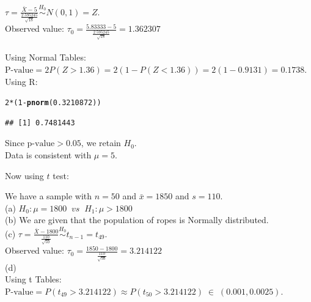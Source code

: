 \documentclass[bigtut]{tutorial}\usepackage[]{graphicx}\usepackage[]{color}
\makeatletter
\newcommand{\hlnum}[1]{\textcolor[rgb]{0.686,0.059,0.569}{#1}}%
\newcommand{\hlopt}[1]{\textcolor[rgb]{0,0,0}{#1}}%
\newcommand{\hlstd}[1]{\textcolor[rgb]{0.345,0.345,0.345}{#1}}%
\newcommand{\hlkwd}[1]{\textcolor[rgb]{0.737,0.353,0.396}{\textbf{#1}}}%
\newenvironment{kframe}{%
 \def\at@end@of@kframe{}%
 \ifinner\ifhmode%
  \def\at@end@of@kframe{\end{minipage}}%
  \begin{minipage}{\columnwidth}%
 \fi\fi%
 \def\FrameCommand##1{\hskip\@totalleftmargin \hskip-\fboxsep
 \colorbox{shadecolor}{##1}\hskip-\fboxsep
     \hskip-\linewidth \hskip-\@totalleftmargin \hskip\columnwidth}%
 \MakeFramed {\advance\hsize-\width
   \@totalleftmargin\z@ \linewidth\hsize
   \@setminipage}}%
 {\par\unskip\endMakeFramed%
 \at@end@of@kframe}
\newenvironment{knitrout}{}{} %
\makeatother
\begin{document}
\begin{tutorial}
\begin{questions}
\begin{solution}
$\tau = \frac{ \bar{X} - 5}{\frac{2.595245}{\sqrt{18}}} \overset{H_0}{\sim} N(0,1) = Z$. \\
Observed value: $\tau_{0} = \frac{5.83333-5}{\frac{2.595245}{\sqrt{18}}} = 1.362307$ \\

 \\

Using Normal Tables: \\
$\text{P-value} = 2 P( Z > 1.36) = 2(1-P(Z < 1.36)) = 2(1-0.9131)  = 0.1738$. \\

Using R:
\begin{knitrout}
\color{fgcolor}\begin{kframe}
\begin{alltt}
\hlnum{2}\hlopt{*}\hlstd{(}\hlnum{1}\hlopt{-}\hlkwd{pnorm}\hlstd{(}\hlnum{0.3210872}\hlstd{))}
\end{alltt}
\begin{verbatim}
## [1] 0.7481443
\end{verbatim}
\end{kframe}
\end{knitrout}

\vspace{.5cm}
Since $\text{p-value} > 0.05$, we retain $H_{0}$. \\
Data is consistent with $\mu = 5$.

\vspace{1cm}
Now using $t$ test:

We have a sample with $n=50$ and $\bar{x}=1850$ and $s=110$. \\

(a)
$H_0: \mu=1800  \;\; vs \;\; H_1: \mu>1800$ \\

(b)
We are given that the population of ropes is Normally distributed. \\

(c)
$\tau = \frac{ \bar{X} - 1800}{\frac{110}{\sqrt{50}} } \overset{H_0}{\sim}  t_{n-1} = t_{49}$. \\
Observed value: $\tau_{0} = \frac{1850-1800}{\frac{110}{\sqrt{50}} } = 3.214122 $ \\

(d)
 \\

Using t Tables: \\
$\text{P-value} = P( t_{49} > 3.214122 ) \approx  P( t_{50} > 3.214122 ) \; \in \; (0.001,0.0025)$. \\


\end{solution}
\end{questions}
\end{tutorial}
\end{document}
